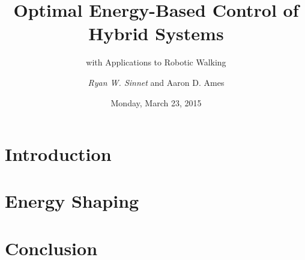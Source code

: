 \documentclass{beamer}
\title[Energy Shaping]{Optimal Energy-Based Control of Hybrid Systems}
\subtitle{with Applications to Robotic Walking}
\author{\emph{Ryan W. Sinnet} and Aaron D. Ames}
\institute{Department of Mechanical Engineering\\ Texas A\&M University}
\date{Monday, March 23, 2015}
\begin{document}
\frame{\titlepage}



\section{Introduction}
\showtoc




\section{Energy Shaping}
\showtoc

\section{Conclusion}
\showtoc
\end{document}

